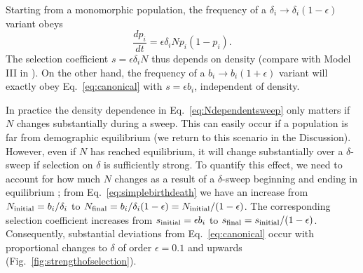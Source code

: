 \documentclass[12pt]{article}
\begin{document}
Starting from a monomorphic population, the frequency of a $\delta_i\rightarrow \delta_i(1-\epsilon)$ variant obeys 
\begin{equation}
\frac{d p_i}{dt}=\epsilon \delta_i N p_i(1-p_i). \label{eq:Ndependentsweep}
\end{equation}
The selection coefficient $s=\epsilon \delta_i N$ thus depends on density (compare with Model III in \cite{kimura1969natural}). On the other hand, the frequency of a $b_i\rightarrow b_i(1+\epsilon)$ variant will exactly obey Eq.~\eqref{eq:canonical} with $s=\epsilon b_i$, independent of density.

In practice the density dependence in Eq.~\eqref{eq:Ndependentsweep} only matters if $N$ changes substantially during a sweep. This can easily occur if a population is far from demographic equilibrium (we return to this scenario in the Discussion). However, even if $N$ has reached equilibrium, it will change substantially over a $\delta$-sweep if selection on $\delta$ is sufficiently strong. To quantify this effect, we need to account for how much $N$ changes as a result of a $\delta$-sweep beginning and ending in equilibrium \citep{kimura1969natural}; from Eq.~\eqref{eq:simplebirthdeath} we have an increase from $N_{\rm initial}=b_i/\delta_i$ to $N_{\rm final}=b_i/\delta_i(1-\epsilon)=N_{\rm initial}/(1-\epsilon)$. The corresponding selection coefficient increases from $s_{\rm initial}= \epsilon b_i$ to $s_{\rm final}=s_{\rm initial}/(1-\epsilon)$. Consequently, substantial deviations from Eq.~\eqref{eq:canonical} occur with proportional changes to $\delta$ of order $\epsilon=0.1$ and upwards (Fig.~\ref{fig:strengthofselection}). 
\end{document}
